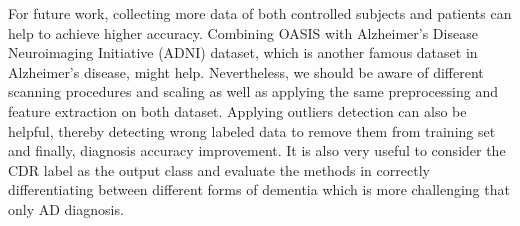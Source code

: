 For future work, collecting more data of both controlled subjects and patients can help to achieve higher accuracy. Combining OASIS with Alzheimer’s Disease Neuroimaging Initiative (ADNI) dataset, which is another famous dataset in Alzheimer's disease, might help. Nevertheless, we should be aware of different scanning procedures and scaling as well as applying the same preprocessing and feature extraction on both dataset. Applying outliers detection can also be helpful, thereby detecting wrong labeled data to remove them from training set and finally, diagnosis accuracy improvement. It is also very useful to consider the CDR label as the output class and evaluate the methods in correctly differentiating between different forms of dementia which is more challenging that only AD diagnosis. 

